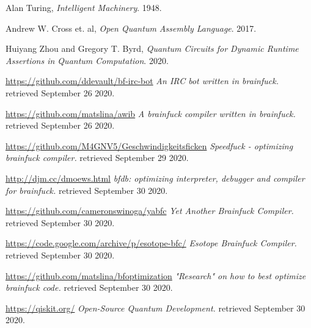 \documentclass[11pt, a4paper]{article}
\begin{document}
\begin{thebibliography}{9}
	 Alan Turing,
		\textit{Intelligent Machinery}.
		1948.
		
	 Andrew W. Cross et. al,
		\textit{Open Quantum Assembly Language}.
		2017.
		
	 Huiyang Zhou and Gregory T. Byrd,
		\textit{Quantum Circuits for Dynamic Runtime Assertions in Quantum Computation}.
		2020.

	 \url{https://github.com/ddevault/bf-irc-bot}
		\textit{An IRC bot written in brainfuck.}
		retrieved September 26 2020.

	 \url{https://github.com/matslina/awib}
		\textit{A brainfuck compiler written in brainfuck.}
		retrieved September 26 2020.
	
	 \url{https://github.com/M4GNV5/Geschwindigkeitsficken}
		\textit{Speedfuck - optimizing brainfuck compiler.}
		retrieved September 29 2020.
		
	 \url{http://djm.cc/dmoews.html}
		\textit{bfdb: optimizing interpreter, debugger and compiler for brainfuck.}
		retrieved September 30 2020.
		
			
	 \url{https://github.com/cameronswinoga/yabfc}
		\textit{Yet Another Brainfuck Compiler.}
		retrieved September 30 2020.
		
			
	 \url{https://code.google.com/archive/p/esotope-bfc/}
		\textit{Esotope Brainfuck Compiler.}
		retrieved September 30 2020.
		
			
	 \url{https://github.com/matslina/bfoptimization}
		\textit{"Research" on how to best optimize brainfuck code.}
		retrieved September 30 2020.
		
	 \url{https://qiskit.org/}
		\textit{Open-Source Quantum Development.}
		retrieved September 30 2020.
\end{thebibliography}
\end{document}
